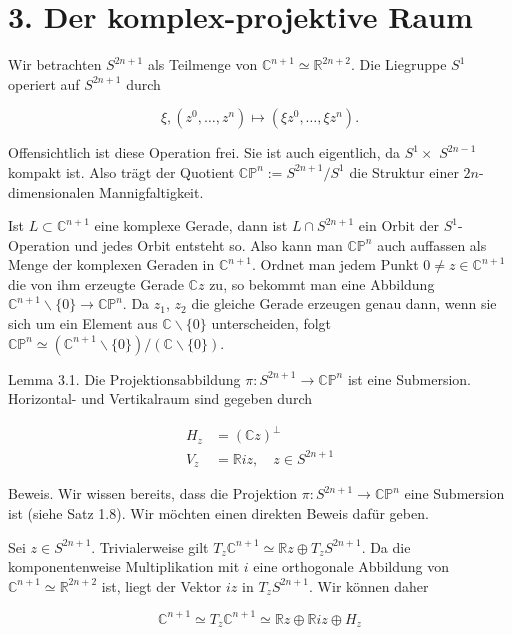 \documentclass[10pt]{article}
\begin{document}
\section*{3. Der komplex-projektive Raum}
Wir betrachten $S^{2 n+1}$ als Teilmenge von $\mathbb{C}^{n+1} \simeq \mathbb{R}^{2 n+2}$. Die Liegruppe $S^{1}$ operiert auf $S^{2 n+1}$ durch

$$
\xi,\left(z^{0}, \ldots, z^{n}\right) \mapsto\left(\xi z^{0}, \ldots, \xi z^{n}\right) .
$$

Offensichtlich ist diese Operation frei. Sie ist auch eigentlich, da $S^{1} \times$ $S^{2 n-1}$ kompakt ist. Also trägt der Quotient $\mathbb{C} \mathbb{P}^{n}:=S^{2 n+1} / S^{1}$ die Struktur einer $2 n$-dimensionalen Mannigfaltigkeit.

Ist $L \subset \mathbb{C}^{n+1}$ eine komplexe Gerade, dann ist $L \cap S^{2 n+1}$ ein Orbit der $S^{1}$-Operation und jedes Orbit entsteht so. Also kann man $\mathbb{C P}^{n}$ auch auffassen als Menge der komplexen Geraden in $\mathbb{C}^{n+1}$. Ordnet man jedem Punkt $0 \neq z \in \mathbb{C}^{n+1}$ die von ihm erzeugte Gerade $\mathbb{C} z$ zu, so bekommt man eine Abbildung $\mathbb{C}^{n+1} \backslash\{0\} \rightarrow \mathbb{C} \mathbb{P}^{n}$. Da $z_{1}$, $z_{2}$ die gleiche Gerade erzeugen genau dann, wenn sie sich um ein Element aus $\mathbb{C} \backslash\{0\}$ unterscheiden, folgt $\mathbb{C P}^{n} \simeq\left(\mathbb{C}^{n+1} \backslash\{0\}\right) /(\mathbb{C} \backslash\{0\})$.

Lemma 3.1. Die Projektionsabbildung $\pi: S^{2 n+1} \rightarrow \mathbb{C P}^{n}$ ist eine Submersion. Horizontal- und Vertikalraum sind gegeben durch

$$
\begin{aligned}
H_{z} & =(\mathbb{C} z)^{\perp} \\
V_{z} & =\mathbb{R} i z, \quad z \in S^{2 n+1}
\end{aligned}
$$

Beweis. Wir wissen bereits, dass die Projektion $\pi: S^{2 n+1} \rightarrow \mathbb{C} \mathbb{P}^{n}$ eine Submersion ist (siehe Satz 1.8). Wir möchten einen direkten Beweis dafür geben.

Sei $z \in S^{2 n+1}$. Trivialerweise gilt $T_{z} \mathbb{C}^{n+1} \simeq \mathbb{R} z \oplus T_{z} S^{2 n+1}$. Da die komponentenweise Multiplikation mit $i$ eine orthogonale Abbildung von $\mathbb{C}^{n+1} \simeq \mathbb{R}^{2 n+2}$ ist, liegt der Vektor $i z$ in $T_{z} S^{2 n+1}$. Wir können daher

$$
\mathbb{C}^{n+1} \simeq T_{z} \mathbb{C}^{n+1} \simeq \mathbb{R} z \oplus \mathbb{R} i z \oplus H_{z}
$$
\end{document}
